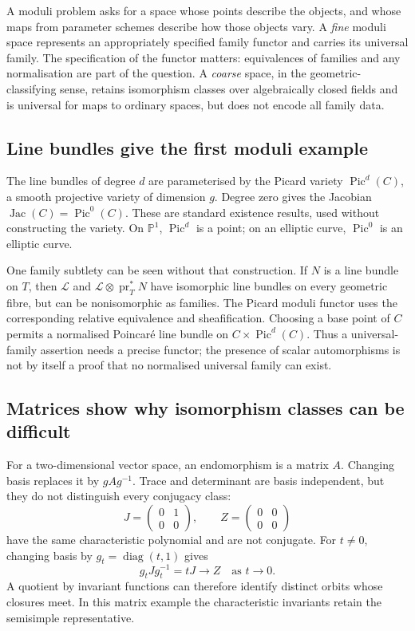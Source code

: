 \documentclass[11pt,a4paper]{article}
\numberwithin{equation}{section}
\theoremstyle{definition}
\newcommand{\PP}{\mathbb P}
\newcommand{\Pic}{\operatorname{Pic}}
\newcommand{\Jac}{\operatorname{Jac}}
\begin{document}
A moduli problem asks for a space whose points describe the objects,
and whose maps from parameter schemes describe how those objects vary.
A \emph{fine} moduli space represents an appropriately specified family
functor and carries its universal family. The specification of the
functor matters: equivalences of families and any normalisation are
part of the question. A \emph{coarse} space, in the geometric-classifying
sense, retains isomorphism classes over algebraically closed fields
and is universal for maps to ordinary spaces, but does not encode all
family data.

\subsection{Line bundles give the first moduli example}
The line bundles of degree $d$ are parameterised by the Picard variety
$\Pic^d(C)$, a smooth projective variety of dimension $g$. Degree zero
gives the Jacobian $\Jac(C)=\Pic^0(C)$. These are standard existence
results, used without constructing the variety. On $\PP^1$, $\Pic^d$
is a point; on an elliptic curve, $\Pic^0$ is an elliptic curve.

One family subtlety can be seen without that construction. If $N$ is a
line bundle on $T$, then $\mathcal L$ and
$\mathcal L\otimes\operatorname{pr}_T^*N$ have isomorphic line bundles
on every geometric fibre, but can be nonisomorphic as families.
The Picard moduli functor uses the corresponding relative equivalence
and sheafification. Choosing a base point of $C$ permits a normalised
Poincaré line bundle on $C\times\Pic^d(C)$.
Thus a universal-family assertion needs a precise functor; the presence
of scalar automorphisms is not by itself a proof that no normalised
universal family can exist.

\subsection{Matrices show why isomorphism classes can be difficult}
For a two-dimensional vector space, an endomorphism is a matrix $A$.
Changing basis replaces it by $gAg^{-1}$. Trace and determinant are
basis independent, but they do not distinguish every conjugacy class:
\[
 J=\begin{pmatrix}0&1\\0&0\end{pmatrix},\qquad
 Z=\begin{pmatrix}0&0\\0&0\end{pmatrix}
\]
have the same characteristic polynomial and are not conjugate.
For $t\ne0$, changing basis by $g_t=\operatorname{diag}(t,1)$ gives
\[
 g_tJg_t^{-1}=tJ\longrightarrow Z\quad\text{as }t\to0.
\]
A quotient by invariant functions can therefore
identify distinct orbits whose closures meet. In this matrix example
the characteristic invariants retain the semisimple representative.
\end{document}
